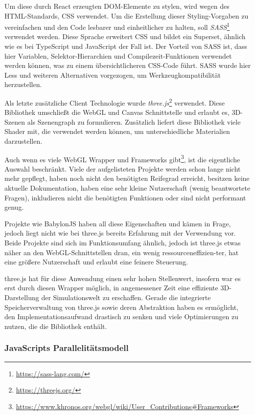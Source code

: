 Um diese durch React erzeugten DOM-Elemente zu stylen, wird wegen des HTML-Standards, CSS verwendet.
Um die Erstellung dieser Styling-Vorgaben zu vereinfachen und den Code lesbarer und einheitlicher zu halten, soll \textit{SASS}\footnote{\url{https://sass-lang.com/}} verwendet werden.
Diese Sprache erweitert CSS und bildet ein Superset, ähnlich wie es bei TypeScript und JavaScript der Fall ist.
Der Vorteil von SASS ist, dass hier Variablen, Selektor-Hierarchien und Compilezeit-Funktionen verwendet werden können, was zu einem übersichtlicheren CSS-Code führt.
SASS wurde hier Less und weiteren Alternativen vorgezogen, um Werkzeugkompatibilität herzustellen.

Als letzte zusätzliche Client Technologie wurde \textit{three.js}\footnote{\url{https://threejs.org/}} verwendet.
Diese Bibliothek umschließt die WebGL und Canvas Schnittstelle und erlaubt es, 3D-Szenen als Szenengraph zu formulieren.
Zusätzlich liefert diese Bibliothek viele Shader mit, die verwendet werden können, um unterschiedliche Materialien darzustellen.

Auch wenn es viele WebGL Wrapper und Frameworks gibt\footnote{\url{https://www.khronos.org/webgl/wiki/User_Contributions\#Frameworks}}, ist die eigentliche Auswahl beschränkt.
Viele der aufgelisteten Projekte werden schon lange nicht mehr gepflegt, haben noch nicht den benötigten Reifegrad erreicht, besitzen keine aktuelle Dokumentation, haben eine sehr kleine Nutzerschaft (wenig beantwortete Fragen), inkludieren nicht die benötigten Funktionen oder sind nicht performant genug.

Projekte wie BabylonJS haben all diese Eigenschaften und kämen in Frage, jedoch liegt nicht wie bei three.js bereits Erfahrung mit der Verwendung vor.
Beide Projekte sind sich im Funktionsumfang ähnlich, jedoch ist three.js etwas näher an den WebGL-Schnittstellen dran, ein wenig ressourceneffizien-\linebreak ter\autocite{karlsson2018}, hat eine größere Nutzerschaft\autocite{npmtrends2022} und erlaubt eine feinere Steuerung.

three.js hat für diese Anwendung einen sehr hohen Stellenwert, insofern war es erst durch diesen Wrapper möglich, in angemessener Zeit eine effiziente 3D-Darstellung der Simulationswelt zu erschaffen.
Gerade die integrierte Speicherverwaltung von three.js sowie deren Abstraktion haben es ermöglicht, den Implementationsaufwand drastisch zu senken und viele Optimierungen zu nutzen, die die Bibliothek enthält.


\subsubsection{JavaScripts Parallelitätsmodell}

